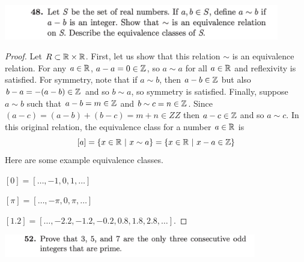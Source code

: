 \documentclass[12pt]{scrartcl}
\begin{document}
\newpage

\includegraphics[width=12cm]{48.png}

\begin{proof}
Let $R \subset \mathbb R \times \mathbb R$. First, let us show that this relation $\sim$ is an equivalence relation. 
For any $a \in \mathbb R$, $a - a = 0 \in \mathbb Z$, so $a \sim a$ for all $a \in \mathbb R$ and reflexivity 
is satisfied. For symmetry, note that if $a \sim b$, then $a - b \in \mathbb Z$ but also 
$b -a = -(a-b) \in \mathbb Z$ and so $b \sim a$, so symmetry is satisfied. Finally, suppose $a\sim b$
such that $a - b = m \in \mathbb Z$ and $b \sim c = n \in \mathbb Z$. Since $(a-c) = (a-b) + (b-c) = m + n \in ZZ$ then 
$a-c\in \mathbb Z$ and so $a \sim c$. In this original relation, the equivalence class for a number $a \in \mathbb R$ is 
\[[a] = \{x \in \mathbb R \ | \ x \sim a\} = \{x \in \mathbb R \ | \ x - a \in \mathbb Z\}\] 
Here are some example equivalence classes. 

$[0] = [\ldots, -1, 0, 1, \ldots]$

$[\pi] = [\ldots, -\pi, 0, \pi, \ldots]$

$[1.2] = [\ldots, -2.2, -1.2, -0.2, 0.8, 1.8, 2.8, \ldots]$.
\end{proof}

\newpage 

\includegraphics[width=11cm]{52.png}
\end{document}
